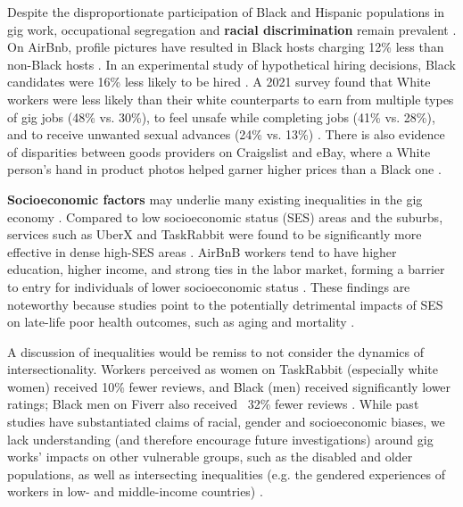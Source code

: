 Despite the disproportionate participation of Black and Hispanic populations in gig work, occupational segregation and \textbf{racial discrimination} remain prevalent \cite{England_undated-gk}. On AirBnb, profile pictures have resulted in Black hosts charging 12\% less than non-Black hosts \cite{edelman2014digital}. In an experimental study of hypothetical hiring decisions, Black candidates were 16\% less likely to be hired \cite{Leung2020-rk}. A 2021 survey found that White workers were less likely than their white counterparts to earn from multiple types of gig jobs (48\% vs. 30\%), to feel unsafe while completing jobs (41\% vs. 28\%), and to receive unwanted sexual advances (24\% vs. 13\%) \cite{Gelles-Watnick2021-fz}. There is also evidence of disparities between goods providers on Craigslist and eBay, where a White person's hand in product photos helped garner higher prices than a Black one \cite{Rosenblat2017-bm}.

\textbf{Socioeconomic factors} may underlie many existing inequalities in the gig economy \cite{Shaw2022-ai}. Compared to low socioeconomic status (SES) areas and the suburbs, services such as UberX and TaskRabbit were found to be significantly more effective in dense high-SES areas \cite{Thebault-Spieker2017-bv}. AirBnB workers tend to have higher education, higher income, and strong ties in the labor market, forming a barrier to entry for individuals of lower socioeconomic status \cite{Ilsoe_undated-mr}. These findings are noteworthy because studies point to the potentially detrimental impacts of SES on late-life poor health outcomes, such as aging and mortality \cite{Freni-Sterrantino2021-fq,Pathak2022-ah}.

A discussion of inequalities would be remiss to not consider the dynamics of intersectionality. Workers perceived as women on TaskRabbit (especially white women) received 10\% fewer reviews, and Black (men) received significantly lower ratings; Black men on Fiverr also received ~32\% fewer reviews \cite{Hannak2017-xn}. While past studies have substantiated claims of racial, gender and socioeconomic biases, we lack understanding (and therefore encourage future investigations) around gig works' impacts on other vulnerable groups, such as the disabled and older populations, as well as intersecting inequalities (e.g. the gendered experiences of workers in low- and middle-income countries) \cite{Barakat2022-tz,Hunt2019-qb}.

